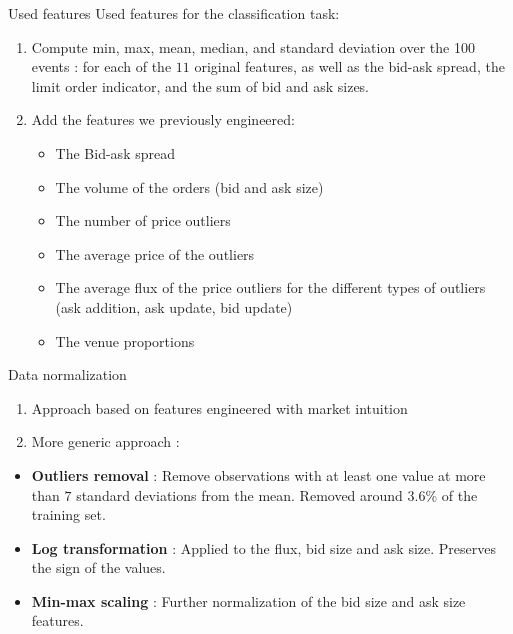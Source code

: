 \documentclass{beamer}
\begin{document}
\begin{frame}{Used features}
    Used features for the classification task:
    \begin{enumerate}
        \item Compute min, max, mean, median, and standard deviation over the 100 events : for each of the $11$ original features, as well as the bid-ask spread, the limit order indicator, and the sum of bid and ask sizes.
        \item Add the features we previously engineered:
              \begin{itemize}
                  \item The Bid-ask spread
                  \item The volume of the orders (bid and ask size)
                  \item The number of price outliers
                  \item The average price of the outliers
                  \item The average flux of the price outliers for the different types of outliers (ask addition, ask update, bid update)
                  \item The venue proportions
              \end{itemize}
    \end{enumerate}
\end{frame}

\begin{frame}{Data normalization}
    \begin{enumerate}
        \item Approach based on features engineered with market intuition \checkmark
        \item More generic approach :
    \end{enumerate}
    \vspace{5mm}
    \begin{itemize}
        \item \textbf{Outliers removal} : Remove observations with at least one value at more than $7$ standard deviations from the mean. Removed around $3.6\%$ of the training set.
        \item \textbf{Log transformation} : Applied to the flux, bid size and ask size. Preserves the sign of the values.
        \item \textbf{Min-max scaling} : Further normalization of the bid size and ask size features.
    \end{itemize}
\end{frame}
\end{document}
